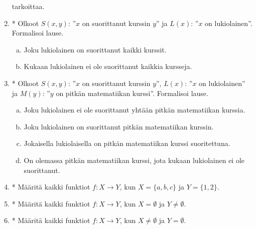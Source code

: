 \begin{kotitehtavasivu}
\begin{enumerate}
tarkoittaa.%
\item *
 Olkoot $S(x, y)$: ''$x$ on suorittanut
kurssin $y$'' ja $L(x)$: ''$x$ on lukiolainen''. Formalisoi lause.
\begin{enumerate}[a)]
\item Joku lukiolainen on suorittanut kaikki kurssit.
\item Kukaan lukiolainen ei ole suorittanut kaikkia kursseja.
\end{enumerate}%
\item *
Olkoot $S(x, y)$: ''$x$ on suorittanut
kurssin $y$'', $L(x)$: ''$x$ on lukiolainen'' ja $M(y)$: ''$y$ on
pitkän matematiikan kurssi''. Formalisoi lause.
\begin{enumerate}[a)]
\item Joku lukiolainen ei ole suorittanut yhtään pitkän
matematiikan kurssia.
\item Joku lukiolainen on suorittanut pitkän matematiikan
kurssin.
\item Jokaisella lukiolaisella on pitkän matematiikan kurssi
suoritettuna.
\item On olemassa pitkän matematiikan kurssi, jota kukaan
lukiolainen ei ole suorittanut.
\end{enumerate}%
\item *
Määritä kaikki funktiot $f\colon X\to Y$,
kun $X=\{a, b, c\}$ ja $Y=\{1, 2\}$.%
\item *
Määritä kaikki funktiot $f\colon X\to Y$,
kun $X=\emptyset$ ja $Y\neq \emptyset$.%
\item *
Määritä kaikki funktiot $f\colon X\to Y$,
kun $X\neq \emptyset$ ja $Y= \emptyset$.%
%
\end{enumerate}

\end{kotitehtavasivu}
